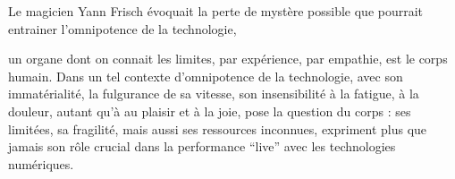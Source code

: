 Le magicien Yann Frisch évoquait la perte de mystère possible que pourrait entrainer l'omnipotence de la technologie,

un organe dont on connait les limites, par expérience, par empathie, est le corps humain. 
Dans un tel contexte d'omnipotence de la technologie, avec son immatérialité, la fulgurance de sa vitesse, son insensibilité à la fatigue, à la douleur, autant qu'à au plaisir et à la joie, pose la question du corps : ses limitées, sa fragilité, mais aussi ses ressources inconnues, expriment plus que jamais son rôle crucial dans la performance ``live'' avec les technologies numériques.